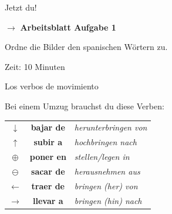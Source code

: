 \documentclass[aspectratio=169, 11pt]{beamer}
\newcommand{\seriftext}[1]{{\fontfamily{ppl}\selectfont #1}}
\newcommand{\es}[1]{\seriftext{\textbf{#1}}}
\newcommand{\de}[1]{\textit{\textcolor{mittelgrau}{#1}}}
\newcommand{\abmark}[1]{{\Large$\rightarrow$ \textbf{Arbeitsblatt Aufgabe #1}}}
\begin{document}
\begin{frame}{Jetzt du!}
    \vspace{1cm}

    \begin{center}
        \abmark{1}

        \vspace{1cm}

        {\large Ordne die Bilder den spanischen Wörtern zu.}

        \vspace{0.5cm}

        {\small Zeit: 10 Minuten}
    \end{center}
\end{frame}


\begin{frame}{Los verbos de movimiento}
    \vspace{0.3cm}

    {\large Bei einem Umzug brauchst du diese Verben:}

    \vspace{0.5cm}

    \begin{center}
    \begin{tabular}{@{}ccl@{}}
        $\downarrow$ & \es{bajar de} & \de{herunterbringen von} \\[0.5em]
        $\uparrow$ & \es{subir a} & \de{hochbringen nach} \\[0.5em]
        $\oplus$ & \es{poner en} & \de{stellen/legen in} \\[0.5em]
        $\ominus$ & \es{sacar de} & \de{herausnehmen aus} \\[0.5em]
        $\leftarrow$ & \es{traer de} & \de{bringen (her) von} \\[0.5em]
        $\rightarrow$ & \es{llevar a} & \de{bringen (hin) nach} \\
    \end{tabular}
    \end{center}
\end{frame}
\end{document}
